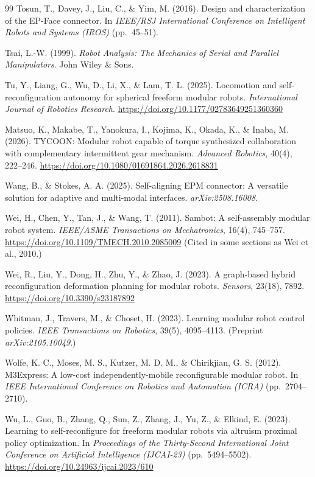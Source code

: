 \documentclass[11pt,a4paper]{article}
\begin{document}
{\begin{thebibliography}{99}
Tosun, T., Davey, J., Liu, C., \& Yim, M. (2016). Design and characterization
of the EP-Face connector. In \textit{IEEE/RSJ International Conference on
Intelligent Robots and Systems (IROS)} (pp.\ 45--51).

Tsai, L.-W. (1999). \textit{Robot Analysis: The Mechanics of Serial and
Parallel Manipulators}. John Wiley \& Sons.

Tu, Y., Liang, G., Wu, D., Li, X., \& Lam, T. L. (2025). Locomotion and
self-reconfiguration autonomy for spherical freeform modular robots.
\textit{International Journal of Robotics Research}.
\url{https://doi.org/10.1177/02783649251360360}

Matsuo, K., Makabe, T., Yanokura, I., Kojima, K., Okada, K., \& Inaba, M.
(2026). TYCOON: Modular robot capable of torque synthesized collaboration with
complementary intermittent gear mechanism. \textit{Advanced Robotics}, 40(4),
222--246. \url{https://doi.org/10.1080/01691864.2026.2618831}

Wang, B., \& Stokes, A. A. (2025). Self-aligning EPM connector: A versatile
solution for adaptive and multi-modal interfaces. \textit{arXiv:2508.16008}.

Wei, H., Chen, Y., Tan, J., \& Wang, T. (2011). Sambot: A self-assembly modular
robot system. \textit{IEEE/ASME Transactions on Mechatronics}, 16(4),
745--757. \url{https://doi.org/10.1109/TMECH.2010.2085009}
(Cited in some sections as Wei et al., 2010.)

Wei, R., Liu, Y., Dong, H., Zhu, Y., \& Zhao, J. (2023). A graph-based hybrid
reconfiguration deformation planning for modular robots. \textit{Sensors},
23(18), 7892. \url{https://doi.org/10.3390/s23187892}

Whitman, J., Travers, M., \& Choset, H. (2023). Learning modular robot control
policies. \textit{IEEE Transactions on Robotics}, 39(5), 4095--4113.
(Preprint \textit{arXiv:2105.10049}.)

Wolfe, K. C., Moses, M. S., Kutzer, M. D. M., \& Chirikjian, G. S. (2012).
M3Express: A low-cost independently-mobile reconfigurable modular robot. In
\textit{IEEE International Conference on Robotics and Automation (ICRA)}
(pp.\ 2704--2710).

Wu, L., Guo, B., Zhang, Q., Sun, Z., Zhang, J., Yu, Z., \& Elkind, E. (2023).
Learning to self-reconfigure for freeform modular robots via altruism proximal
policy optimization. In \textit{Proceedings of the Thirty-Second International
Joint Conference on Artificial Intelligence (IJCAI-23)} (pp.\ 5494--5502).
\url{https://doi.org/10.24963/ijcai.2023/610}


\end{thebibliography}}
\end{document}
